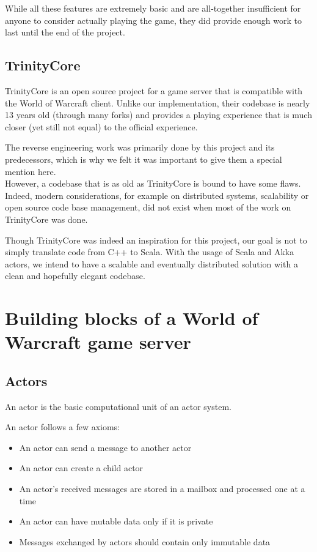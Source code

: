 \documentclass[paper=a4, fontsize=11pt]{scrartcl}
\begin{document}
While all these features are extremely basic and are all-together insufficient
for anyone to consider actually playing the game, they did provide enough work
to last until the end of the project.

\subsection{TrinityCore}

TrinityCore is an open source project for a game server that is compatible with
the World of Warcraft client.
Unlike our implementation, their codebase is nearly 13 years old (through many
forks) and provides a playing experience that is much closer (yet still not
equal) to the official experience.

The reverse engineering work was primarily done by this project and its
predecessors, which is why we felt it was important to give them a special
mention here.\\

However, a codebase that is as old as TrinityCore is bound to have some
flaws. Indeed, modern considerations, for example on distributed systems,
scalability or open source code base management, did not exist when most of the
work on TrinityCore was done.

Though TrinityCore was indeed an inspiration for this project, our goal is not
to simply translate code from C++ to Scala.
With the usage of Scala and Akka actors, we intend to have a scalable and
eventually distributed solution with a clean and hopefully elegant codebase.

\section{Building blocks of a World of Warcraft game server}

\subsection{Actors}

An actor is the basic computational unit of an actor system.

An actor follows a few axioms:
\begin{itemize}
    \item An actor can send a message to another actor
    \item An actor can create a child actor
    \item An actor's received messages are stored in a mailbox and processed one
        at a time
    \item An actor can have mutable data only if it is private
    \item Messages exchanged by actors should contain only immutable data
\end{itemize}
\end{document}
